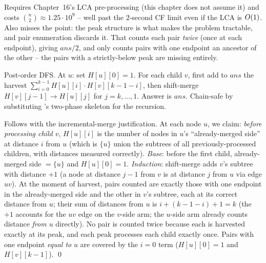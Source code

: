 \begin{thinkbox}
{Requires Chapter~16's LCA pre-processing (this chapter does not assume
it) and costs $\binom{n}{2}\approx 1.25\cdot 10^{9}$ -- well past the
$2$-second CF limit even if the LCA is $O(1)$. Also misses the
point: the peak structure is what makes the problem tractable, and
pair enumeration discards it.}
{That counts each pair \emph{twice} (once at each endpoint), giving
$\mathit{ans}/2$, and only counts pairs with one endpoint an ancestor of
the other -- the pairs with a strictly-below peak are missing entirely.}
\end{thinkbox}

Post-order DFS. At $u$: set $\mathit{H}[u][0]=1$. For each child $v$, first
add to $\mathit{ans}$ the harvest $\sum_{i=0}^{k-1}\mathit{H}[u][i]\cdot\mathit{H}[v][k-1-i]$,
then shift-merge $\mathit{H}[v][j-1]\to\mathit{H}[u][j]$ for
$j=k,\dots,1$. Answer is $\mathit{ans}$. Chain-safe by substituting
's two-phase skeleton for the recursion.

\begin{proofbox}
Follows  with the incremental-merge
justification. At each node $u$, we claim: \emph{before processing child
$v$}, $\mathit{H}[u][i]$ is the number of nodes in $u$'s ``already-merged
side'' at distance $i$ from $u$ (which is $\{u\}$ union the subtrees of
all previously-processed children, with distances measured correctly).
\emph{Base}: before the first child, already-merged side $=\{u\}$ and
$\mathit{H}[u][0]=1$. \emph{Induction}: shift-merge adds $v$'s subtree
with distance $+1$ (a node at distance $j-1$ from $v$ is at distance $j$
from $u$ via edge $uv$). At the moment of harvest, pairs counted are
exactly those with one endpoint in the already-merged side and the other
in $v$'s subtree, each at its correct distance from $u$; their sum of
distances from $u$ is $i + (k-1-i) + 1 = k$ (the $+1$ accounts for the
$uv$ edge on the $v$-side arm; the $u$-side arm already counts distance
\emph{from $u$} directly). No pair is counted twice because each is
harvested exactly at its peak, and each peak processes each child exactly
once. Pairs with one endpoint \emph{equal to} $u$ are covered by the
$i=0$ term ($\mathit{H}[u][0]=1$ and $\mathit{H}[v][k-1]$). \qed
\end{proofbox}

